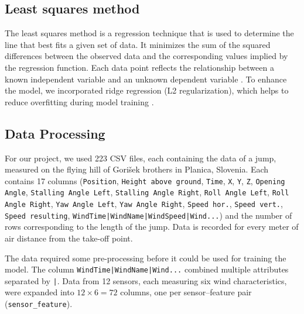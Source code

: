 \documentclass[sigconf]{acmart}
\begin{document}
\subsection{Least squares method}
The least squares method is a regression technique that is used to determine
the line that best fits a given set of data. It minimizes the sum of the
squared differences between the observed data and the corresponding values
implied by the regression function. Each data point reflects the relationship
between a known independent variable and an unknown dependent variable
\cite{plestenjak2016}. To enhance the model, we incorporated ridge regression
(L2 regularization), which helps to reduce overfitting during model training
\cite{vanwieringen2015}.

\subsection{Data Processing}
For our project, we used 223 CSV files, each containing the data of a jump,
measured on the flying hill of Gorišek brothers in Planica, Slovenia. Each
contains 17 columns (\texttt{Position}, \texttt{Height above ground},
\texttt{Time}, \texttt{X}, \texttt{Y}, \texttt{Z}, \texttt{Opening Angle},
\texttt{Stalling Angle Left}, \texttt{Stalling Angle Right},
\texttt{Roll Angle Left}, \texttt{Roll Angle Right}, \texttt{Yaw Angle Left},
\texttt{Yaw Angle Right}, \texttt{Speed hor.}, \texttt{Speed vert.},
\texttt{Speed resulting}, \texttt{WindTime|WindName|WindSpeed|Wind...}) and the
number of rows corresponding to the length of the jump. Data is recorded for
every meter of air distance from the take-off point.

The data required some pre-processing before it could be used for training the
model. The column \texttt{WindTime|WindName|Wind...} combined multiple
attributes separated by \texttt{|}. Data from 12 sensors, each measuring six
wind characteristics, were expanded into $12 \times 6 = 72$ columns, one per
sensor--feature pair (\texttt{sensor\_feature}).
\end{document}
